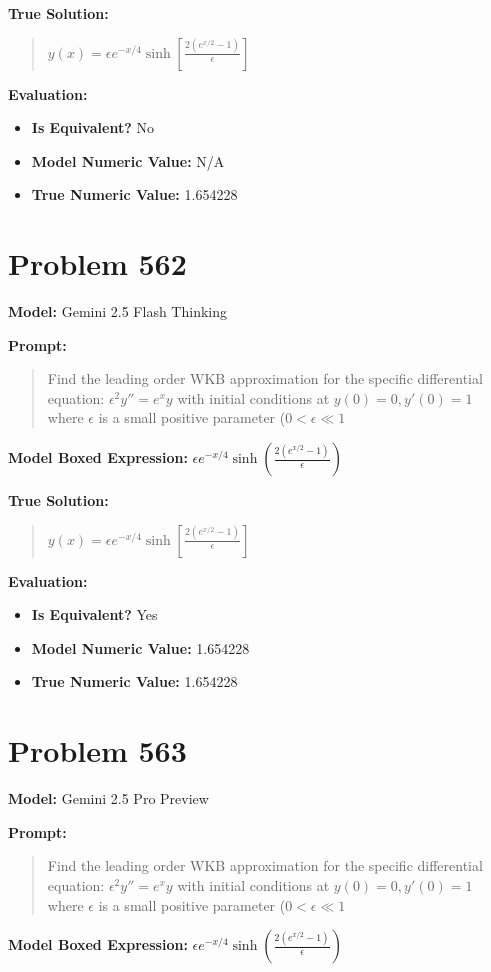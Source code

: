 \documentclass{article}
\begin{document}
\textbf{True Solution:}
\begin{quote}
$y(x) =\epsilon e^{-x/4}\sinh\left[\frac{2\left(e^{x/2}-1\right)}{\epsilon}\right]$
\end{quote}

\textbf{Evaluation:}
\begin{itemize}
\item \textbf{Is Equivalent?} No
\item \textbf{Model Numeric Value:} N/A
\item \textbf{True Numeric Value:} 1.654228
\end{itemize}
\vspace{1cm}
\section*{Problem 562}
\textbf{Model:} Gemini 2.5 Flash Thinking

\textbf{Prompt:}
\begin{quote}
Find the leading order WKB approximation for the specific differential equation: $\epsilon^2 y'' = e^x y$ with initial conditions at $y(0)=0, y'(0)=1$ where $\epsilon$ is a small positive parameter ($0 < \epsilon \ll 1$
\end{quote}
\textbf{Model Boxed Expression:} $\epsilon e^{-x/4} \sinh\left(\frac{2(e^{x/2}-1)}{\epsilon}\right)$

\textbf{True Solution:}
\begin{quote}
$y(x) =\epsilon e^{-x/4}\sinh\left[\frac{2\left(e^{x/2}-1\right)}{\epsilon}\right]$
\end{quote}

\textbf{Evaluation:}
\begin{itemize}
\item \textbf{Is Equivalent?} Yes
\item \textbf{Model Numeric Value:} 1.654228
\item \textbf{True Numeric Value:} 1.654228
\end{itemize}
\vspace{1cm}
\section*{Problem 563}
\textbf{Model:} Gemini 2.5 Pro Preview

\textbf{Prompt:}
\begin{quote}
Find the leading order WKB approximation for the specific differential equation: $\epsilon^2 y'' = e^x y$ with initial conditions at $y(0)=0, y'(0)=1$ where $\epsilon$ is a small positive parameter ($0 < \epsilon \ll 1$
\end{quote}
\textbf{Model Boxed Expression:} $\epsilon e^{-x/4} \sinh\left(\frac{2(e^{x/2}-1)}{\epsilon}\right)$
\end{document}
